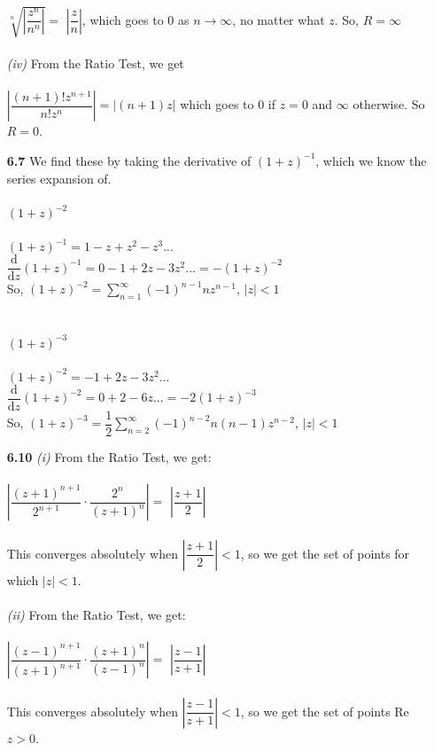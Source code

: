 \begin{enumerate}
$\sqrt[n]{\left|\dfrac{z^n}{n^n}\right|}=$
$\left|\dfrac{z}{n}\right|$,
which goes to 0 as $n\rightarrow\infty$, no matter what $z$. So, $R=\infty$
\\\\
\textit{(iv)}
From the Ratio Test, we get \\\\
$\left|\dfrac{(n+1)!z^{n+1}}{n!z^n}\right|=|(n+1)z|$
which goes to 0 if $z=0$ and $\infty$ otherwise. So $R=0$.
\item[\textbf{6.7}] 
We find these by taking the derivative of $(1+z)^{-1}$, which we know the series expansion of.\\\\
$(1+z)^{-2}$ \\\\
$(1+z)^{-1} = 1-z+z^2-z^3...$ \\
$\dfrac{\mathrm{d}}{\mathrm{d}z}(1+z)^{-1} = 0 - 1 + 2z - 3z^2... = -(1+z)^{-2}$ \\
So, $(1+z)^{-2} = \displaystyle\sum\limits_{n=1}^\infty 
(-1)^{n-1}nz^{n-1}$, $|z| < 1$
\\\\\\
$(1+z)^{-3}$ \\\\
$(1+z)^{-2} = - 1 + 2z - 3z^2...$ \\
$\dfrac{\mathrm{d}}{\mathrm{d}z}(1+z)^{-2} = 0 + 2 - 6z... = -2(1+z)^{-3}$ \\
So, $(1+z)^{-3} = \dfrac{1}{2}\displaystyle\sum\limits_{n=2}^\infty 
(-1)^{n-2}n(n-1)z^{n-2}$, $|z| < 1$
\item[\textbf{6.10}] 
\textit{(i)}
From the Ratio Test, we get: \\\\
$\left|\dfrac{(z+1)^{n+1}}{2^{n+1}}\cdot\dfrac{2^{n}}{(z+1)^{n}}\right|=$
$\left|\dfrac{z+1}{2}\right|$ \\\\
This converges absolutely when $\left|\dfrac{z+1}{2}\right|<1$, so we get the set of points for which $|z| < 1$.
\\\\
\textit{(ii)}
From the Ratio Test, we get: \\\\
$\left|\dfrac{(z-1)^{n+1}}{(z+1)^{n+1}}\cdot\dfrac{(z+1)^{n}}{(z-1)^{n}}\right|=$
$\left|\dfrac{z-1}{z+1}\right|$ \\\\
This converges absolutely when $\left|\dfrac{z-1}{z+1}\right|<1$, so we get the set of points Re $z > 0$.

\end{enumerate}
